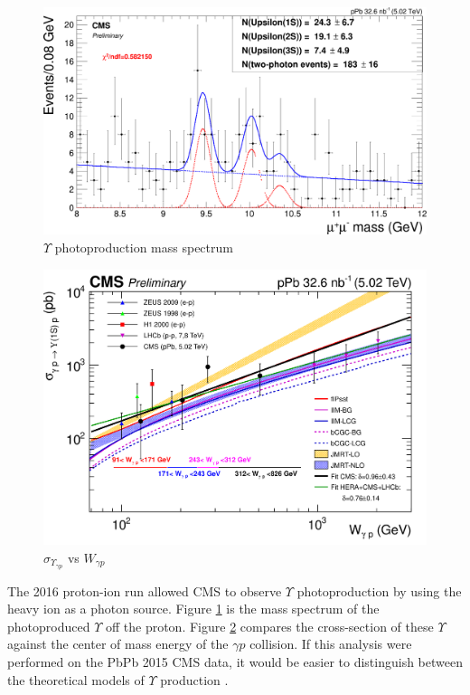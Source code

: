 \begin{figure}[h!]
\begin{centering}
\includegraphics[width=4.5in]{Chapter2/importfigs/ruchi_mass.png}
\par\end{centering}
\caption{$\Upsilon$ photoproduction mass spectrum \cite{Chudasama:2016eck} \label{fig:ruchiMass}}
\end{figure}

\begin{figure}[h!]
\begin{centering}
\includegraphics[width=4.5in]{Chapter2/importfigs/Upsilon_1S_data_theory_fitall_160316.png}
\par\end{centering}
\caption{$\sigma_{\Upsilon_{\gamma p}}$ vs $W_{\gamma p}$ \cite{Chudasama:2016eck} \label{fig:ruchiXsec}}
\end{figure} 
 
The 2016 proton-ion run allowed CMS to observe $\Upsilon$ photoproduction by using the heavy ion as a photon source. Figure \ref{fig:ruchiMass} is the mass spectrum of the photoproduced $\Upsilon$ off the proton. Figure \ref{fig:ruchiXsec} compares the cross-section of these $\Upsilon$ against the center of mass energy of the $\gamma p$ collision. If this analysis were performed on the PbPb 2015 CMS data, it would be easier to distinguish between the theoretical models of $\Upsilon$ production \cite{Chudasama:2016eck}. 

